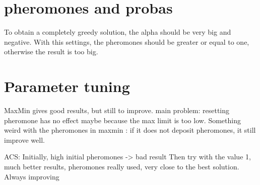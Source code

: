 \documentclass{article}
\begin{document}
\section{pheromones and probas}

To obtain a completely greedy solution, the alpha should be very big and negative.
With this settings, the pheromones should be greater or equal to one, otherwise the result is too big.

\section{Parameter tuning}

MaxMin gives good results, but still to improve.
main problem: resetting pheromone has no effect maybe because the max limit is too low.
Something weird with the pheromones in maxmin : if it does not deposit pheromones, it still improve well.\newline \newline

ACS: Initially, high initial pheromones -> bad result
Then try with the value 1, much better results, pheromones really used, very close to the best solution.
Always improving
\end{document}
